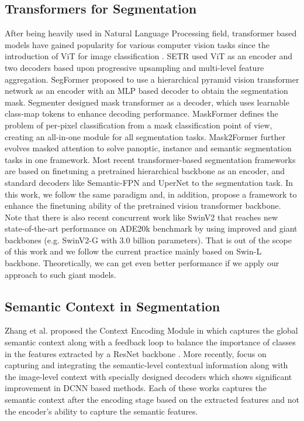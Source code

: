 \documentclass[10pt,twocolumn,letterpaper]{article}
\begin{document}
\subsection{Transformers for Segmentation}
After being heavily used in Natural Language Processing field, transformer \cite{vaswani2017attention} based models have gained popularity for various computer vision tasks since the introduction of ViT \cite{vit} for image classification \cite{vit, perceiver, deit, cctv1}. SETR used ViT \cite{vit} as an encoder and two decoders based upon progressive upsampling and multi-level feature aggregation. SegFormer \cite{segformer} proposed to use a hierarchical pyramid vision transformer network as an encoder with an MLP based decoder to obtain the segmentation mask. 
Segmenter \cite{segmenter} designed mask transformer as a decoder, which uses learnable class-map tokens to enhance decoding performance. 
MaskFormer \cite{maskformer} defines the problem of per-pixel classification from a mask classification point of view, creating an all-in-one module for all segmentation tasks. Mask2Former \cite{mask2former} further evolves masked attention to solve panoptic, instance and semantic segmentation tasks in one framework. Most recent transformer-based segmentation frameworks \cite{swin-T, cswin-T} are based on finetuning a pretrained hierarchical backbone as an encoder, and standard decoders like Semantic-FPN and UperNet \cite{sem-fpn, upernet} to the segmentation task. In this work, we follow the same paradigm and, in addition, propose a framework to enhance the finetuning ability of the pretrained vision transformer backbone. Note that there is also recent concurrent work like SwinV2 \cite{swinv2} that reaches new state-of-the-art performance on ADE20k benchmark by using improved and giant backbones (e.g. SwinV2-G with 3.0 billion parameters). That is out of the scope of this work and we follow the current practice mainly based on Swin-L backbone. Theoretically, we can get even better performance if we apply our approach to such giant models.

\subsection{Semantic Context in Segmentation}

Zhang et al. proposed the Context Encoding Module in \cite{encnet} which captures the global semantic context along with a feedback loop to balance the importance of classes in the features extracted by a ResNet backbone \cite{resnet}. 
More recently, \cite{isnet, mining-context} focus on capturing and integrating the semantic-level contextual information along with the image-level context with specially designed decoders which shows significant improvement in DCNN based methods. 
Each of these works captures the semantic context after the encoding stage based on the extracted features and not the encoder's ability to capture the semantic features.
\end{document}
